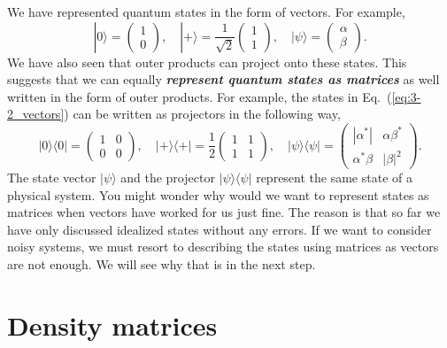 We have represented quantum states in the form of vectors.
For example,
\begin{equation}
    |0\rangle = \begin{pmatrix} 1 \\ 0 \end{pmatrix}, \quad |+\rangle = \frac{1}{\sqrt{2}} \begin{pmatrix} 1 \\ 1 \end{pmatrix}, \quad |\psi\rangle = \begin{pmatrix} \alpha \\ \beta \end{pmatrix}.
    \label{eq:3-2_vectors}
\end{equation}
We have also seen that outer products can project onto these states.
This suggests that we can equally \textit{\textbf{represent quantum states as matrices}} as well written in the form of outer products.
For example, the states in Eq.~(\ref{eq:3-2_vectors}) can be written as projectors in the following way,
\begin{equation}
    |0\rangle\langle0| = \begin{pmatrix} 1 & 0 \\ 0 & 0 \end{pmatrix}, \quad |+\rangle\langle+| = \frac{1}{2} \begin{pmatrix} 1 & 1 \\ 1 & 1 \end{pmatrix}, \quad |\psi\rangle\langle\psi| = \begin{pmatrix} |\alpha^*| & \alpha\beta^* \\ \alpha^*\beta & |\beta|^2 \end{pmatrix}.
\end{equation}
The state vector $|\psi\rangle$ and the projector $|\psi\rangle\langle\psi|$ represent the same state of a physical system.
You might wonder why would we want to represent states as matrices when vectors have worked for us just fine.
The reason is that so far we have only discussed idealized states without any errors.
If we want to consider noisy systems, we must resort to describing the states using matrices as vectors are not enough.
We will see why that is in the next step.



\section{Density matrices}
\label{sec:3-3_density_matrices}


